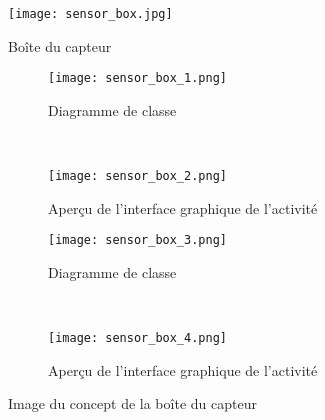 \begin{figure}[htb]
\centering 
\texttt{[image: sensor\_box.jpg]} 
\caption{Boîte du capteur}
\label{fig:sensor_box_real}
\end{figure}

\begin{figure}[htb!]
    \centering
    \begin{subfigure}[htb]{0.49\textwidth}
		\texttt{[image: sensor\_box\_1.png]} 
		\caption{Diagramme de classe}
		\label{fig:sensor_box_1}
    \end{subfigure}
    ~ %
    \begin{subfigure}[htb]{0.49\textwidth}
		\texttt{[image: sensor\_box\_2.png]} 
		\caption{Aperçu de l'interface graphique de l'activité}
		\label{fig:sensor_box_2}
    \end{subfigure}
    \begin{subfigure}[htb]{0.49\textwidth}
		\texttt{[image: sensor\_box\_3.png]} 
		\caption{Diagramme de classe}
		\label{fig:sensor_box_3}
    \end{subfigure}
    ~ %
    \begin{subfigure}[htb]{0.49\textwidth}
		\texttt{[image: sensor\_box\_4.png]} 
		\caption{Aperçu de l'interface graphique de l'activité}
		\label{fig:sensor_box_4}
    \end{subfigure}    
    \caption{Image du concept de la boîte du capteur}\label{fig:sensor_box}
\end{figure}
